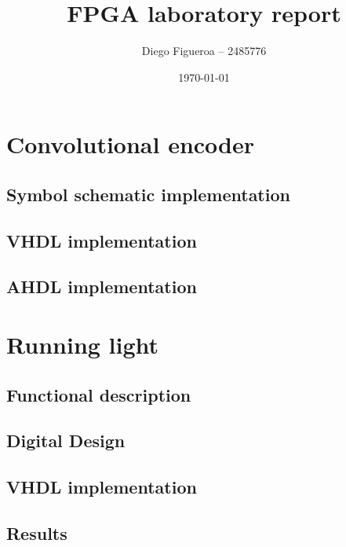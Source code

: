 \documentclass[12pt]{article}   	%
\title{FPGA laboratory report}
\author{Diego Figueroa -- 2485776}
\date{\today}							%
\begin{document}
\maketitle


\section{Convolutional encoder}


\subsection{Symbol schematic implementation}


\subsection{VHDL implementation}




\subsection{AHDL implementation}




\section{Running light}

\subsection{Functional description}



\subsection{Digital Design}



\subsection{VHDL implementation}


\subsection{Results}
\end{document}

